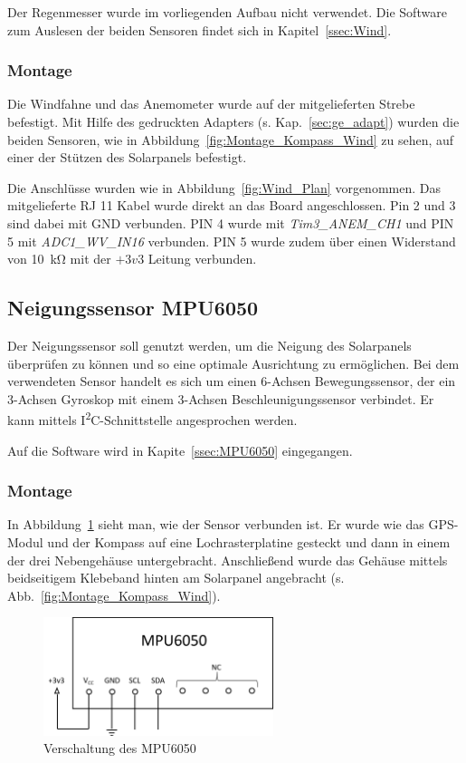 Der Regenmesser wurde im vorliegenden Aufbau nicht verwendet. Die Software zum Auslesen der beiden Sensoren findet sich in Kapitel~\ref{ssec:Wind}.

\subsubsection{Montage}
Die Windfahne und das Anemometer wurde auf der mitgelieferten Strebe befestigt. Mit Hilfe des gedruckten Adapters (s. Kap.~\ref{sec:ge_adapt}) wurden die beiden Sensoren, wie in Abbildung~\ref{fig:Montage_Kompass_Wind} zu sehen, auf einer der Stützen des Solarpanels befestigt.

Die Anschlüsse wurden wie in Abbildung~\ref{fig:Wind_Plan} vorgenommen. Das mitgelieferte RJ 11 Kabel wurde direkt an das Board angeschlossen. Pin 2 und 3 sind dabei mit GND verbunden. PIN 4 wurde mit \textit{Tim3\_ANEM\_CH1} und PIN 5 mit \textit{ADC1\_WV\_IN16} verbunden. PIN 5 wurde zudem über einen Widerstand von \SI{10}{\kilo\ohm} mit der $+3v3$ Leitung verbunden.

\subsection{Neigungssensor MPU6050}
Der Neigungssensor soll genutzt werden, um die Neigung des Solarpanels überprüfen zu können und so eine optimale Ausrichtung zu ermöglichen. Bei dem verwendeten Sensor handelt es sich um einen 6-Achsen Bewegungssensor, der ein 3-Achsen Gyroskop mit einem 3-Achsen Beschleunigungssensor verbindet. Er kann mittels I\textsuperscript{2}C-Schnittstelle angesprochen werden. \cite{MPU-6050_Manual}

Auf die Software wird in Kapite~\ref{ssec:MPU6050} eingegangen.

\subsubsection{Montage}
In Abbildung~\ref{fig:MPU6050_Plan} sieht man, wie der Sensor verbunden ist. Er wurde wie das GPS-Modul und der Kompass auf eine Lochrasterplatine gesteckt und dann in einem der drei Nebengehäuse untergebracht. Anschließend wurde das Gehäuse mittels beidseitigem Klebeband hinten am Solarpanel angebracht (s. Abb.~\ref{fig:Montage_Kompass_Wind}).

\begin{figure}[H]
  \centering
  \includegraphics[width=0.6\textwidth]{./img/MPU6050_Plan.png}
  \caption{Verschaltung des MPU6050}\label{fig:MPU6050_Plan}
\end{figure}

